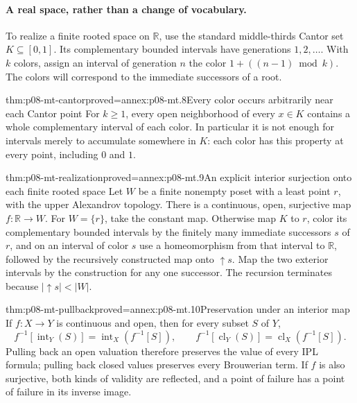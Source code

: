 \paragraph{A real space, rather than a change of vocabulary.}
To realize a finite rooted space on \(\mathbb R\), use the standard
middle-thirds Cantor set \(K\subseteq[0,1]\). Its complementary bounded
intervals have generations \(1,2,\ldots\). With \(k\) colors, assign
an interval of generation \(n\) the color \(1+((n-1)\bmod k)\).
The colors will correspond to the immediate successors of a root.

\begin{hblemma}{thm:p08-mt-cantor}{proved=annex:p08-mt.8}{Every color occurs arbitrarily near each Cantor point}
For \(k\geq1\), every open neighborhood of every \(x\in K\) contains
a whole complementary interval of each color. In particular it is not
enough for intervals merely to accumulate somewhere in \(K\): each
color has this property at every point, including \(0\) and \(1\).
\end{hblemma}

\begin{hbtheorem}{thm:p08-mt-realization}{proved=annex:p08-mt.9}{An explicit interior surjection onto each finite rooted space}
Let \(W\) be a finite nonempty poset with a least point \(r\), with the
upper Alexandrov topology. There is a continuous, open, surjective map
\(f:\mathbb R\to W\). For \(W=\{r\}\), take the constant map.
Otherwise map \(K\) to \(r\), color its complementary bounded
intervals by the finitely many immediate successors \(s\) of \(r\),
and on an interval of color \(s\) use a homeomorphism from that interval
to \(\mathbb R\), followed by the recursively constructed map onto
\(\uparrow s\). Map the two exterior intervals by the construction
for any one successor. The recursion terminates because
\(|\uparrow s|<|W|\).
\end{hbtheorem}

\begin{hblemma}{thm:p08-mt-pullback}{proved=annex:p08-mt.10}{Preservation under an interior map}
If \(f:X\to Y\) is continuous and open, then for every subset \(S\)
of \(Y\),
\[
 f^{-1}[\operatorname{int}_Y(S)]
 =\operatorname{int}_X(f^{-1}[S]),\qquad
 f^{-1}[\operatorname{cl}_Y(S)]
 =\operatorname{cl}_X(f^{-1}[S]).
\]
Pulling back an open valuation therefore preserves the value of every
IPL formula; pulling back closed values preserves every Brouwerian
term. If \(f\) is also surjective, both kinds of validity are reflected,
and a point of failure has a point of failure in its inverse image.
\end{hblemma}


